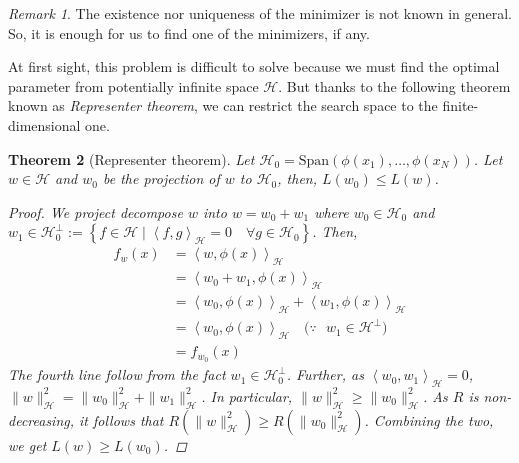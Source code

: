 \documentclass{amsart}
\newtheorem{theorem}{Theorem}[section]
\theoremstyle{definition}
\theoremstyle{remark}
\newtheorem{remark}[theorem]{Remark}
\numberwithin{equation}{section}
\begin{document}
\begin{remark}
The existence nor uniqueness of the minimizer is not known in general.
So, it is enough for us to find one of the minimizers, if any.
\end{remark}

At first sight, this problem is difficult to solve because we must find the optimal parameter
from potentially infinite space $\mathcal{H}$.
But thanks to the following theorem known as \textit{Representer theorem}, we can restrict the search space 
to the finite-dimensional one.

\begin{theorem}[Representer theorem]
Let $\mathcal{H}_0 = \mathrm{Span}(\phi(x_1), \ldots, \phi(x_N))$.
Let $w \in \mathcal{H}$ and $w_0$ be the projection of $w$ to $\mathcal{H}_0$, then, $L(w_0) \leq L(w)$.
\begin{proof}
We project decompose $w$ into $w = w_0 + w_1$ where $w_0\in \mathcal{H}_0$ and $w_1 \in \mathcal{H}_0^{\perp} := \left\{ f \in \mathcal{H} \mid \left<f, g\right>_\mathcal{H}=0 \quad \forall g\in \mathcal{H}_0 \right\}$.
Then,
\begin{equation}
\begin{split}
f_w(x) &= \left< w, \phi(x) \right>_\mathcal{H}\\
       &= \left< w_0 + w_1, \phi(x) \right>_\mathcal{H}\\
       &= \left< w_0, \phi(x)\right>_\mathcal{H} + \left< w_1, \phi(x) \right>_\mathcal{H}\\
       &= \left< w_0, \phi(x)\right>_\mathcal{H} \quad \text{($\because$ $w_1 \in \mathcal{H}^{\perp}$)}\\ 
       &= f_{w_0}(x)
\end{split}
\end{equation}
The fourth line follow from the fact $w_1\in \mathcal{H}_0^{\perp}$.
Further, as $\left<w_0, w_1\right>_{\mathcal{H}} = 0$, $\|w\|_{\mathcal{H}}^{2} = \|w_0\|_{\mathcal{H}}^{2} + \|w_1\|_{\mathcal{H}}^{2}$.
In particular, $\|w\|_{\mathcal{H}}^{2} \geq \|w_0\|_{\mathcal{H}}^{2}$.
As $R$ is non-decreasing, it follows that $R(\|w\|_{\mathcal{H}}^{2}) \geq R(\|w_0\|_{\mathcal{H}}^{2})$.
Combining the two, we get $L(w)\geq L(w_0)$.
\end{proof}
\end{theorem}
\end{document}
